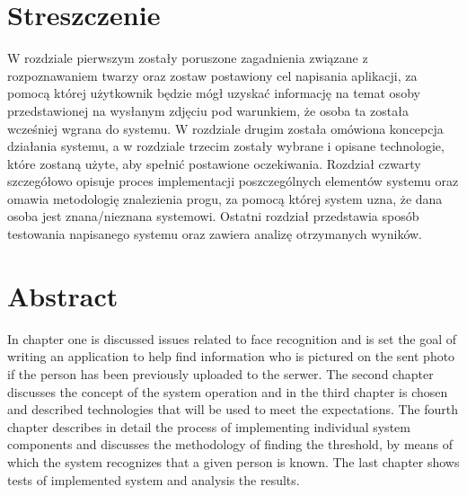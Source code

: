 \section*{Streszczenie}

W rozdziale pierwszym zostały poruszone zagadnienia związane z rozpoznawaniem twarzy oraz zostaw
postawiony cel napisania aplikacji, za pomocą której użytkownik będzie mógł uzyskać informację na temat
osoby przedstawionej na wysłanym zdjęciu pod warunkiem, że osoba ta została wcześniej wgrana do systemu.
W rozdziale drugim została omówiona koncepcja działania systemu, a w rozdziale trzecim zostały wybrane i opisane
technologie, które zostaną użyte, aby spełnić postawione oczekiwania.
Rozdział czwarty szczegółowo opisuje proces implementacji poszczególnych elementów systemu oraz omawia
metodologię znalezienia progu, za pomocą której system uzna, że dana osoba jest znana/nieznana systemowi.
Ostatni rozdział przedstawia sposób testowania napisanego systemu oraz zawiera analizę otrzymanych wyników.


\section*{Abstract}

In chapter one is discussed issues related to face recognition and is set the goal of writing an application
to help find information who is pictured on the sent photo if the person has been previously uploaded to the serwer.
The second chapter discusses the concept of the system operation
and in the third chapter is chosen and described technologies that will be used to meet the expectations.
The fourth chapter describes in detail the process of implementing individual
system components and discusses the methodology of finding the threshold,
by means of which the system recognizes that a given person is known.
The last chapter shows tests of implemented system and analysis the results.
